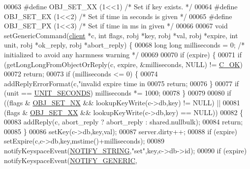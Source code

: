 \begin{DoxyCode}
00063 \textcolor{preprocessor}{#}\textcolor{preprocessor}{define} \textcolor{preprocessor}{OBJ\_SET\_XX} \textcolor{preprocessor}{(}1\textcolor{preprocessor}{<<}1\textcolor{preprocessor}{)}     \textcolor{comment}{/* Set if key exists. */}
00064 \textcolor{preprocessor}{#}\textcolor{preprocessor}{define} \textcolor{preprocessor}{OBJ\_SET\_EX} \textcolor{preprocessor}{(}1\textcolor{preprocessor}{<<}2\textcolor{preprocessor}{)}     \textcolor{comment}{/* Set if time in seconds is given */}
00065 \textcolor{preprocessor}{#}\textcolor{preprocessor}{define} \textcolor{preprocessor}{OBJ\_SET\_PX} \textcolor{preprocessor}{(}1\textcolor{preprocessor}{<<}3\textcolor{preprocessor}{)}     \textcolor{comment}{/* Set if time in ms in given */}
00066 
00067 \textcolor{keywordtype}{void} setGenericCommand(\hyperlink{structclient}{client} *c, \textcolor{keywordtype}{int} flags, robj *key, robj *val, robj *expire, \textcolor{keywordtype}{int} unit, robj 
      *ok\_reply, robj *abort\_reply) \{
00068     \textcolor{keywordtype}{long} \textcolor{keywordtype}{long} milliseconds = 0; \textcolor{comment}{/* initialized to avoid any harmness warning */}
00069 
00070     \textcolor{keywordflow}{if} (expire) \{
00071         \textcolor{keywordflow}{if} (getLongLongFromObjectOrReply(c, expire, &milliseconds, NULL) != 
      \hyperlink{server_8h_a303769ef1065076e68731584e758d3e1}{C\_OK})
00072             \textcolor{keywordflow}{return};
00073         \textcolor{keywordflow}{if} (milliseconds <= 0) \{
00074             addReplyErrorFormat(c,\textcolor{stringliteral}{"invalid expire time in %
00075             \textcolor{keywordflow}{return};
00076         \}
00077         \textcolor{keywordflow}{if} (unit == \hyperlink{server_8h_a8553b0a6c729b15594731a0d37b4fb0d}{UNIT\_SECONDS}) milliseconds *= 1000;
00078     \}
00079 
00080     \textcolor{keywordflow}{if} ((flags & \hyperlink{t__string_8c_ad2c320e7c632cb6c42ff431ec0d0bfaf}{OBJ\_SET\_NX} && lookupKeyWrite(c->db,key) != NULL) ||
00081         (flags & \hyperlink{t__string_8c_a01e9fee690658334c3fa5fb0dfed3ed8}{OBJ\_SET\_XX} && lookupKeyWrite(c->db,key) == NULL))
00082     \{
00083         addReply(c, abort\_reply ? abort\_reply : shared.nullbulk);
00084         \textcolor{keywordflow}{return};
00085     \}
00086     setKey(c->db,key,val);
00087     server.dirty++;
00088     \textcolor{keywordflow}{if} (expire) setExpire(c,c->db,key,mstime()+milliseconds);
00089     notifyKeyspaceEvent(\hyperlink{server_8h_a1902292b73b71baa65d86db2d61b47ce}{NOTIFY\_STRING},\textcolor{stringliteral}{"set"},key,c->db->id);
00090     \textcolor{keywordflow}{if} (expire) notifyKeyspaceEvent(\hyperlink{server_8h_a9fa53dd1068e62365f3964ad3479eec2}{NOTIFY\_GENERIC},
}
\end{DoxyCode}
